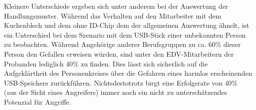 Kleinere Unterschiede ergeben sich unter anderem bei der Auswertung der Handlungsmuster.
Während das Verhalten auf den Mitarbeiter mit dem Kuchenblech und dem ohne ID-Chip dem der allgemeinen Auswertung ähnelt, ist ein Unterschied bei dem Szenario mit dem USB-Stick einer unbekannten Person zu beobachten.
Während Angehörige anderer Berufsgruppen zu ca. 60\% dieser Person den Gefallen erweisen würden, sind unter den EDV-Mitarbeitern der Probanden lediglich 40\% zu finden.
Dies lässt sich sicherlich auf die Aufgeklärtheit des Personenkreises über die Gefahren eines harmlos erscheinenden USB-Speichers zurückführen.
Nichtsdestotrotz birgt eine Erfolgsrate von 40\% (aus der Sicht eines Angreifers) immer noch ein nicht zu unterschätzendes Potenzial für Angriffe.